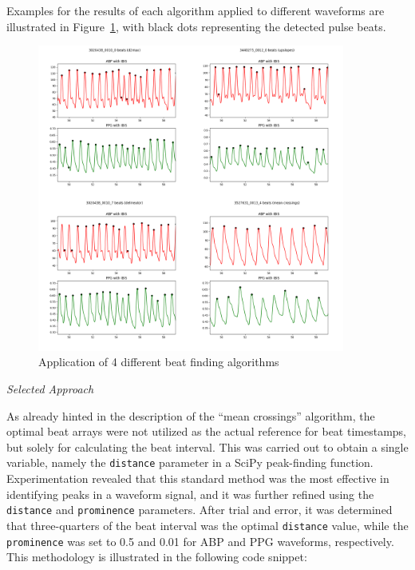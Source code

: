 Examples for the results of each algorithm applied to different waveforms are illustrated in Figure~\ref{fig:beat_algos}, with black dots representing the detected pulse beats.

\begin{figure}[h]
    \includegraphics[width=0.9\textwidth]{images/methods/beat_algos}
    \caption{Application of 4 different beat finding algorithms}
    \label{fig:beat_algos}
\end{figure}

\vspace{0.2cm}
\textit{Selected Approach}
\vspace{0.2cm}

As already hinted in the description of the \enquote{mean crossings} algorithm, the optimal beat arrays were not utilized as the actual reference for beat timestamps, but solely for calculating the beat interval.
This was carried out to obtain a single variable, namely the \texttt{distance} parameter in a SciPy peak-finding function.
Experimentation revealed that this standard method was the most effective in identifying peaks in a waveform signal, and it was further refined using the \texttt{distance} and \texttt{prominence} parameters.
After trial and error, it was determined that three-quarters of the beat interval was the optimal \texttt{distance} value, while the \texttt{prominence} was set to 0.5 and 0.01 for ABP and PPG waveforms, respectively.
This methodology is illustrated in the following code snippet:

